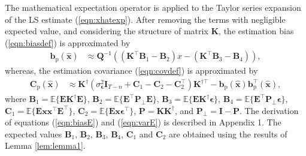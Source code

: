 The mathematical expectation operator is applied to the Taylor series expansion of the LS estimate (\ref{eqn:xhatexp}).
After removing the terms with negligible expected value, and considering the structure of matrix $\mathbf{K}$, the estimation bias (\ref{eqn:biasdef}) is approximated by 
\begin{equation} \begin{aligned} \mathbf{b}_{\mathrm{p}} \left( \widehat{\mathbf{x}} \right) & \approx \mathbf{Q}^{-1} \left( \left( \mathbf{K}^\top \mathbf{B}_1 - \mathbf{B}_2 \right) x - \left( \mathbf{K}^\top \mathbf{B}_3 - \mathbf{B}_4 \right) \right) , \end{aligned} \label{eqn:biasE} \end{equation}
whereas, the estimation covariance (\ref{eqn:covdef}) is approximated by 
\begin{equation} \begin{aligned} \mathbf{C}_{\mathrm{p}} \left( \widehat{\mathbf{x}} \right) & \approx \mathbf{K}^\dagger \left( \sigma_{\bm{\epsilon}}^2 \mathbf{I}_{T-n} + \mathbf{C}_1 - \mathbf{C}_2 - \mathbf{C}_2^\top \right) \mathbf{K}^{\dagger \top} - \mathbf{b}_{\mathrm{p}} \left( \widehat{\mathbf{x}} \right) \mathbf{b}_{\mathrm{p}}^\top \left( \widehat{\mathbf{x}} \right) , \end{aligned} \label{eqn:varE} \end{equation}
where $\mathbf{B}_1 = \mathbb{E} \Big\{ \mathbf{E} \mathbf{K}^\dagger \mathbf{E} \Big\}$, $\mathbf{B}_2 = \mathbb{E} \Big\{ \mathbf{E}^\top \mathbf{P}_\perp \mathbf{E} \Big\}$, $\mathbf{B}_3 = \mathbb{E} \Big\{ \mathbf{E} \mathbf{K}^\dagger \bm{\epsilon} \Big\}$, $\mathbf{B}_4 = \mathbb{E} \Big\{ \mathbf{E}^\top \mathbf{P}_\perp \bm{\epsilon} \Big\}$, $\mathbf{C}_1 = \mathbb{E} \Big\{ \mathbf{E} \mathbf{x} \mathbf{x}^\top \mathbf{E}^\top \Big\}$, $\mathbf{C}_2 = \mathbb{E} \Big\{ \mathbf{E} \mathbf{x} \bm{\epsilon}^\top \Big\}$, $\mathbf{P} = \mathbf{K} \mathbf{K}^\dagger$, and $\mathbf{P}_\perp = \mathbf{I} - \mathbf{P}$. 
The derivation of equations (\ref{eqn:biasE}) and (\ref{eqn:varE}) is described in Appendix 1.
The expected values $\mathbf{B}_1$, $\mathbf{B}_2$, $\mathbf{B}_3$, $\mathbf{B}_4$, $\mathbf{C}_1$ and $\mathbf{C}_2$ are obtained using the results of Lemma \ref{lem:lemma1}.

\newtheorem{thm}{Theorem}
\newtheorem{lem}[thm]{Lemma}

\small

